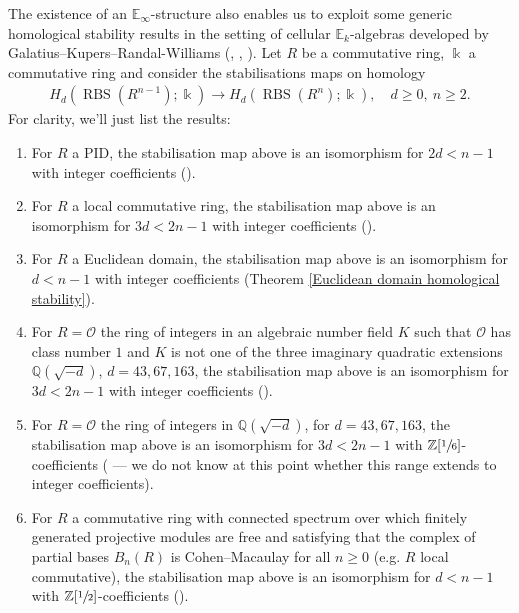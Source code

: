 \documentclass[12pt, reqno]{amsart}
\theoremstyle{plain}
\theoremstyle{definition}
\newcommand{\Z}{\mathbb Z}
\newcommand{\Q}{\mathbb Q}
\begin{document}
The existence of an $\mathbb{E}_\infty$-structure also enables us to exploit some generic homological stability results in the setting of cellular $\mathbb{E}_k$-algebras developed by Galatius--Kupers--Randal-Williams (\cite{GalatiusKupersRandalWilliams}, \cite{KupersMillerPatzt}, \cite{JansenMiller}). Let $R$ be a commutative ring, $\Bbbk$ a commutative ring and consider the stabilisations maps on homology
\begin{align*}
H_d(\operatorname{RBS}(R^{n-1});\Bbbk)\rightarrow H_d(\operatorname{RBS}(R^n);\Bbbk),\quad d\geq 0,\ n\geq 2.
\end{align*}
For clarity, we'll just list the results:
\begin{enumerate}
\item For $R$ a PID, the stabilisation map above is an isomorphism for $2d<n-1$ with integer coefficients ().
\item For $R$ a local commutative ring, the stabilisation map above is an isomorphism for $3d<2n-1$ with integer coefficients  ().
\item For $R$ a Euclidean domain, the stabilisation map above is an isomorphism for $d<n-1$ with integer coefficients (Theorem \ref{Euclidean domain homological stability}).
\item For $R=\mathcal{O}$ the ring of integers in an algebraic number field $K$ such that $\mathcal{O}$ has class number $1$ and $K$ is not one of the three imaginary quadratic extensions $\Q(\sqrt{-d})$, $d=43, 67, 163$, the stabilisation map above is an isomorphism for $3d<2n-1$ with integer coefficients  ().
\item For $R=\mathcal{O}$ the ring of integers in $\Q(\sqrt{-d})$, for $d=43, 67, 163$, the stabilisation map above is an isomorphism for $3d<2n-1$ with $\Z[\sfrac{1}{6}]$-coefficients  ( --- we do not know at this point whether this range extends to integer coefficients).
\item For $R$ a commutative ring with connected spectrum over which finitely generated projective modules are free and satisfying that the complex of partial bases $B_n(R)$ is Cohen–Macaulay for all $n\geq 0$ (e.g. $R$ local commutative), the stabilisation map above is an isomorphism for $d<n-1$ with $\Z[\sfrac{1}{2}]$-coefficients ().
\end{enumerate}
\end{document}
